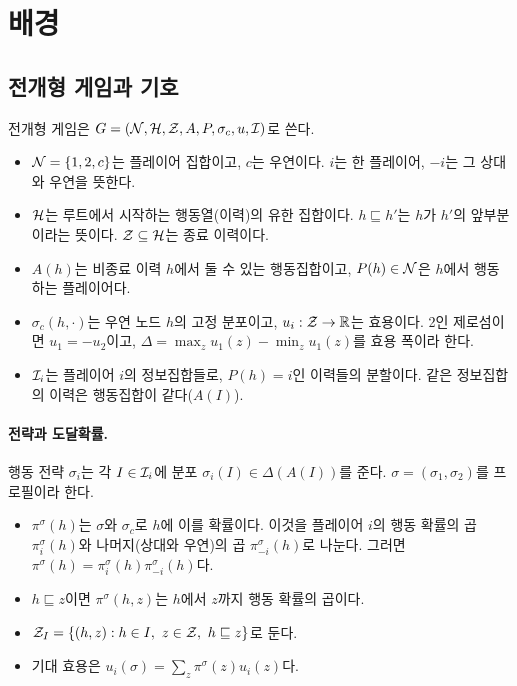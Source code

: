 \section{배경}\label{sec:background}

\subsection{전개형 게임과 기호}\label{sec:bg-notation}
전개형 게임은 $G=(\mathcal{N},\mathcal{H},\mathcal{Z},A,P,\sigma_c,u,\mathcal{I})$로 쓴다.
\begin{itemize}
  \item $\mathcal{N}=\{1,2,c\}$는 플레이어 집합이고, $c$는 우연이다. $i$는 한 플레이어, $-i$는 그 상대와 우연을 뜻한다.
  \item $\mathcal{H}$는 루트에서 시작하는 행동열(이력)의 유한 집합이다. $h\sqsubseteq h'$는 $h$가 $h'$의 앞부분이라는 뜻이다. $\mathcal{Z}\subseteq\mathcal{H}$는 종료 이력이다.
  \item $A(h)$는 비종료 이력 $h$에서 둘 수 있는 행동집합이고, $P(h)\in\mathcal{N}$은 $h$에서 행동하는 플레이어다.
  \item $\sigma_c(h,\cdot)$는 우연 노드 $h$의 고정 분포이고, $u_i:\mathcal{Z}\to\mathbb{R}$는 효용이다. 2인 제로섬이면 $u_1=-u_2$이고, $\Delta=\max_zu_1(z)-\min_zu_1(z)$를 효용 폭이라 한다.
  \item $\mathcal{I}_i$는 플레이어 $i$의 정보집합들로, $P(h)=i$인 이력들의 분할이다. 같은 정보집합의 이력은 행동집합이 같다($A(I)$).
\end{itemize}

\paragraph{전략과 도달확률.}
행동 전략 $\sigma_i$는 각 $I\in\mathcal{I}_i$에 분포 $\sigma_i(I)\in\Delta(A(I))$를 준다. $\sigma=(\sigma_1,\sigma_2)$를 프로필이라 한다.
\begin{itemize}
  \item $\pi^\sigma(h)$는 $\sigma$와 $\sigma_c$로 $h$에 이를 확률이다. 이것을 플레이어 $i$의 행동 확률의 곱 $\pi_i^\sigma(h)$와 나머지(상대와 우연)의 곱 $\pi_{-i}^\sigma(h)$로 나눈다. 그러면 $\pi^\sigma(h)=\pi_i^\sigma(h)\pi_{-i}^\sigma(h)$다.
  \item $h\sqsubseteq z$이면 $\pi^\sigma(h,z)$는 $h$에서 $z$까지 행동 확률의 곱이다.
  \item $\cZ_I=\{(h,z):h\in I,\ z\in\cZ,\ h\sqsubseteq z\}$로 둔다.
  \item 기대 효용은 $u_i(\sigma)=\sum_z\pi^\sigma(z)u_i(z)$다.
\end{itemize}

